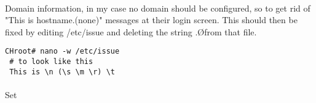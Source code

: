 \documentclass[10pt,a4paper]{article}
\begin{document}
                \paragraph{} Domain information, in my case no domain should be configured, so to get rid of "This is hostname.(none)" messages at their login screen. This should then be fixed by editing /etc/issue and deleting the string .\O from that file.
                \begin{lstlisting}[style=BashInputCHRoot]
 CHroot# nano -w /etc/issue
 # to look like this
 This is \n (\s \m \r) \t
                \end{lstlisting}
                
                \paragraph{} Set 
                
                
                
                

                
\end{document}
